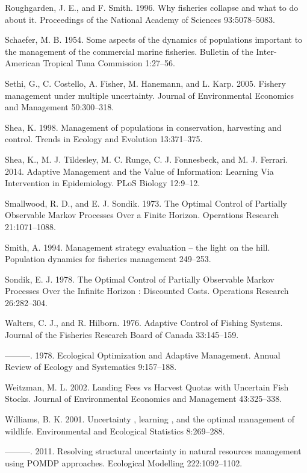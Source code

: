 \documentclass[3p]{elsarticle} %
\begin{document}
\leavevmode\hypertarget{ref-Roughgarden1996}{}%
Roughgarden, J. E., and F. Smith. 1996. Why fisheries collapse and what
to do about it. Proceedings of the National Academy of Sciences
93:5078--5083.

\leavevmode\hypertarget{ref-Schaefer1954}{}%
Schaefer, M. B. 1954. Some aspects of the dynamics of populations
important to the management of the commercial marine fisheries. Bulletin
of the Inter-American Tropical Tuna Commission 1:27--56.

\leavevmode\hypertarget{ref-Sethi2005}{}%
Sethi, G., C. Costello, A. Fisher, M. Hanemann, and L. Karp. 2005.
Fishery management under multiple uncertainty. Journal of Environmental
Economics and Management 50:300--318.

\leavevmode\hypertarget{ref-Shea1998}{}%
Shea, K. 1998. Management of populations in conservation, harvesting and
control. Trends in Ecology and Evolution 13:371--375.

\leavevmode\hypertarget{ref-Shea2014}{}%
Shea, K., M. J. Tildesley, M. C. Runge, C. J. Fonnesbeck, and M. J.
Ferrari. 2014. Adaptive Management and the Value of Information:
Learning Via Intervention in Epidemiology. PLoS Biology 12:9--12.

\leavevmode\hypertarget{ref-Smallwood1973}{}%
Smallwood, R. D., and E. J. Sondik. 1973. The Optimal Control of
Partially Observable Markov Processes Over a Finite Horizon. Operations
Research 21:1071--1088.

\leavevmode\hypertarget{ref-Smith1994}{}%
Smith, A. 1994. Management strategy evaluation -- the light on the hill.
Population dynamics for fisheries management 249--253.

\leavevmode\hypertarget{ref-Sondik1978}{}%
Sondik, E. J. 1978. The Optimal Control of Partially Observable Markov
Processes Over the Infinite Horizon : Discounted Costs. Operations
Research 26:282--304.

\leavevmode\hypertarget{ref-Walters1976}{}%
Walters, C. J., and R. Hilborn. 1976. Adaptive Control of Fishing
Systems. Journal of the Fisheries Research Board of Canada 33:145--159.

\leavevmode\hypertarget{ref-Walters1978}{}%
---------. 1978. Ecological Optimization and Adaptive Management. Annual
Review of Ecology and Systematics 9:157--188.

\leavevmode\hypertarget{ref-Weitzman2002}{}%
Weitzman, M. L. 2002. Landing Fees vs Harvest Quotas with Uncertain Fish
Stocks. Journal of Environmental Economics and Management 43:325--338.

\leavevmode\hypertarget{ref-Williams2001}{}%
Williams, B. K. 2001. Uncertainty , learning , and the optimal
management of wildlife. Environmental and Ecological Statistics
8:269--288.

\leavevmode\hypertarget{ref-Williams2011}{}%
---------. 2011. Resolving structural uncertainty in natural resources
management using POMDP approaches. Ecological Modelling 222:1092--1102.
\end{document}
